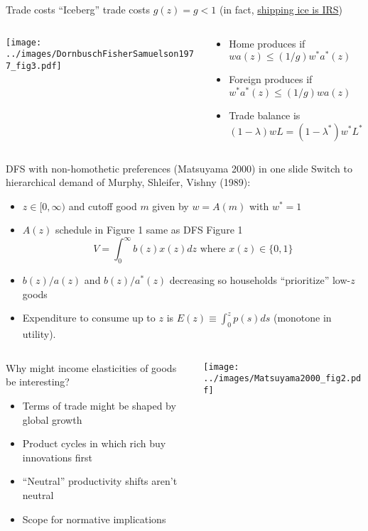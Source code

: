\documentclass[11pt,notes=hide,aspectratio=169]{beamer}
\begin{document}
\begin{frame}{Trade costs}
``Iceberg'' trade costs $g(z) = g < 1$ (in fact, \href{https://ideas.repec.org/p/ces/ceswps/_6881.html}{shipping ice is IRS})
\begin{columns}
\begin{column}{.53\textwidth}
\begin{center}\texttt{[image: ../images/DornbuschFisherSamuelson1977\_fig3.pdf]}\end{center}
\end{column}
\begin{column}{.45\textwidth}
\begin{itemize}
	\item Home produces if $w a(z) \leq (1/g) w^{*} a^{*}(z)$
	\item Foreign produces if $w^{*} a^{*}(z) \leq (1/g) w a(z)$
	\item Trade balance is $(1-\lambda)w L  = (1-\lambda^{*}) w^{*}L^{*}$
\end{itemize}
\end{column}
\end{columns}
\end{frame}
\begin{frame}{DFS with non-homothetic preferences (Matsuyama 2000) in one slide}
Switch to hierarchical demand of Murphy, Shleifer, Vishny (1989):
\begin{itemize}
	\item $z \in [0,\infty)$ and cutoff good $m$ given by $w=A(m)$ with $w^{*}=1$ 
	\item $A(z)$ schedule in Figure 1 same as DFS Figure 1
	\begin{equation*} V = \int_{0}^{\infty} b(z)x(z)dz \text { where } x(z) \in \{0,1\} \end{equation*}
	\item $b(z)/a(z)$ and $b(z)/a^{*}(z)$ decreasing so households ``prioritize'' low-$z$ goods
	\item Expenditure to consume up to $z$ is $E(z)\equiv \int_{0}^{z} p(s)ds$ (monotone in utility).
\end{itemize}
\begin{columns}
\begin{column}{.68\textwidth}
Why might income elasticities of goods be interesting?
\begin{itemize}
	\item Terms of trade might be shaped by global growth
	\item Product cycles in which rich buy innovations first
	\item ``Neutral'' productivity shifts aren't neutral
	\item Scope for normative implications
\end{itemize}
\end{column}
\begin{column}{.30\textwidth}
\texttt{[image: ../images/Matsuyama2000\_fig2.pdf]}
\end{column}
\end{columns}
\end{frame}
\end{document}
